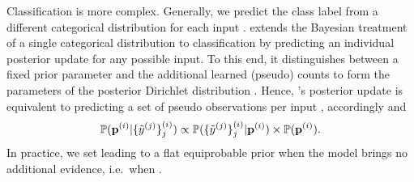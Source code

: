 Classification is more complex. Generally, we predict the class label  from a different categorical distribution  for each input . \oursacro extends the Bayesian treatment of a single categorical distribution to classification by predicting an individual posterior update for any possible input. To this end, it distinguishes between a fixed prior parameter  and the additional learned (pseudo) counts \smash{$\bm{\beta}\dataix$} to form the parameters of the posterior Dirichlet distribution . 
Hence, \oursacro's posterior update is equivalent to predicting a set of pseudo observations  per input , accordingly  and
\begin{equation}
    \begin{aligned}
    \mathbb{P}(\mathbf{p}^{(i)}|\{\tilde{y}^{(j)}\}_j^{(i)}) \propto \mathbb{P}(\{\tilde{y}^{(j)}\}_j^{(i)}|\mathbf{p}^{(i)}) \times \mathbb{P}(\mathbf{p}^{(i)}).
    \end{aligned}
\end{equation}
In practice, we set  leading to a flat equiprobable prior when the model brings no additional evidence, i.e.\ when . 


